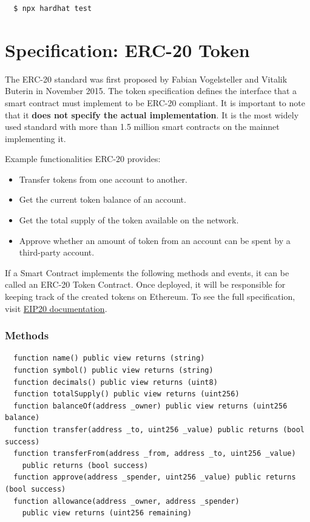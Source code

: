 \documentclass[12pt]{article}
\begin{document}
\begin{verbatim}
  $ npx hardhat test
\end{verbatim}

\section{Specification: ERC-20 Token}

The ERC-20 standard was first proposed by Fabian Vogelsteller and Vitalik Buterin in November 2015. The token specification defines the interface that a smart contract must implement to be ERC-20 compliant. It is important to note that it \textbf{does not specify the actual implementation}. It is the most widely used standard with more than 1.5 million smart contracts on the mainnet implementing it.

Example functionalities ERC-20 provides:

\begin{itemize}
  \item Transfer tokens from one account to another.
  \item Get the current token balance of an account.
  \item Get the total supply of the token available on the network.
  \item Approve whether an amount of token from an account can be spent by a third-party account.
\end{itemize}

If a Smart Contract implements the following methods and events, it can be called an ERC-20 Token Contract. Once deployed, it will be responsible for keeping track of the created tokens on Ethereum. To see the full specification, visit \href{https://eips.ethereum.org/EIPS/eip-20}{EIP20 documentation}.

\subsubsection*{Methods}

\begin{verbatim}
  function name() public view returns (string)
  function symbol() public view returns (string)
  function decimals() public view returns (uint8)
  function totalSupply() public view returns (uint256)
  function balanceOf(address _owner) public view returns (uint256 balance)
  function transfer(address _to, uint256 _value) public returns (bool success)
  function transferFrom(address _from, address _to, uint256 _value) 
    public returns (bool success)
  function approve(address _spender, uint256 _value) public returns (bool success)
  function allowance(address _owner, address _spender) 
    public view returns (uint256 remaining)  
\end{verbatim}
\end{document}
